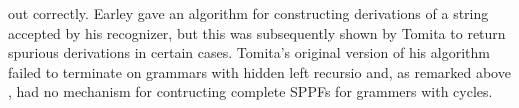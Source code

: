 \begin{isabellebody}
\begin{isamarkuptext}
out correctly. Earley gave an algorithm for constructing derivations of a string accepted by his recognizer,
but this was subsequently shown by Tomita \cite{Tomita:1985} to return spurious derivations in certain cases.
Tomita's original version of his algorithm failed to terminate on grammars with hidden left recursio and, as remarked above
, had no mechanism for contructing complete SPPFs for grammers with cycles.%
\end{isamarkuptext}\isamarkuptrue%
%
\isadelimtheory
%
\endisadelimtheory
%
\isatagtheory
%
\endisatagtheory
{\isafoldtheory}%
%
\isadelimtheory
%
\endisadelimtheory
%
\end{isabellebody}%
\endinput
